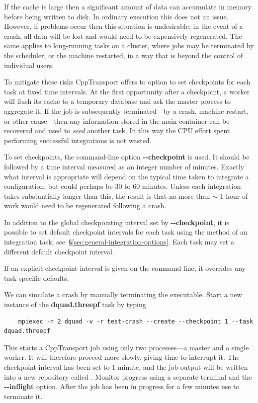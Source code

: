 \documentclass[11pt,a4paper]{article}
\renewcommand{\texttt}[1]{{\ttfamily\fontseries{l}\selectfont{#1}}}
\newcounter{advancedbox}[section]
\newenvironment{advanced}[1]{\stepcounter{advancedbox}\begin{tcolorbox}[enhanced,breakable,colback=red!10,colbacktitle=red!20,colframe=red!40,coltitle=black,title={Advanced usage: {#1}},fonttitle=\sffamily\fontseries{b}\selectfont]}{\end{tcolorbox}}
\newcommand{\repoobject}[1]{{\ttfamily\bfseries\small #1}}
\newcommand{\packagefont}{\sffamily}
\newcommand{\CppTransport}{{\packagefont CppTransport}}
\newcommand{\file}[1]{\texttt{{#1}}}
\newcommand{\option}[1]{{\ttfamily\bfseries\small #1}}
\newcommand{\semibold}[1]{{\fontseries{b}\selectfont{#1}}}
\newcommand{\para}[1]{\par\vspace{2mm}\noindent\semibold{{#1.}---}\ignorespaces}
\begin{document}
If the cache is large then a significant amount of data can
accumulate in memory before being written to disk.
In ordinary execution this does not an issue.
However, if problems occur then this situation is
undesirable:
in the event of a crash, all data will be lost
and would need to be expensively regenerated.
The same applies to long-running tasks on a cluster,
where jobs may be terminated by the scheduler,
or the machine restarted,
in a way that is beyond the control of individual users.

To mitigate these risks {\CppTransport} offers to option
to set checkpoints for each task
at fixed time intervals.
At the first opportunity after a checkpoint,
a worker will flush its cache to a temporary database
and ask the master process to aggregate it.
If the job is subsequently terminated---by a crash,
machine restart, or other cause---then any information
stored in the main container can be recovered
and used to \emph{seed} another task.
In this way the CPU effort spent performing successful
integrations is not wasted.

To set checkpoints, the command-line option
\option{{-}{-}checkpoint} is used. It should be followed
by a time interval measured as an integer number of minutes.
Exactly what interval is appropriate will depend on the
typical time taken to integrate a configuration,
but could perhaps be 30 to 60 minutes.
Unless each integration takes substantially longer
than this, the result is that no more than $\sim$ 1 hour
of work would need to be regenerated following a crash.

\begin{advanced}{Setting default checkpoints for a task}
    In addition to the global checkpointing interval set by
    \option{{-}{-}checkpoint}, it is possible to set default
    checkpoint intervals for each task
    using the \texttt{set_default_checkpoint()}
    method of an integration task; see~\S\ref{sec:general-integration-options}.
    Each task may set a different default checkpoint interval.
    
    If an explicit checkpoint interval is given on the
    command line, it overrides
    any task-specific defaults.
\end{advanced}

\para{Example}
We can simulate a crash by manually terminating
the \file{dquad} executable.
Start a new instance of the
\repoobject{dquad.threepf} task by typing
\begin{verbatim}
    mpiexec -n 2 dquad -v -r test-crash --create --checkpoint 1 --task dquad.threepf
\end{verbatim}
This starts a {\CppTransport} job using only two
processes---a master and a single worker. It will therefore proceed
more slowly, giving time to interrupt it.
The checkpoint interval has been set to 1 minute, and
the job output will be written into a new repository called
\file{test-crash}.
Monitor progress using a separate terminal and the
\option{{-}{-}inflight} option.
After the job has been in progress for a few minutes use
\texttt{Ctrl-C}
to terminate it.
\end{document}
